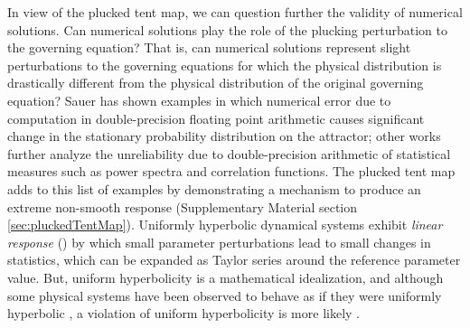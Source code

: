 In view of the plucked tent map, we can question further the
validity of numerical solutions. Can numerical solutions play 
the role of the plucking perturbation to the 
governing equation? That is, can numerical solutions represent 
slight perturbations to the governing equations for which the physical 
distribution is drastically different from the physical distribution 
of the original governing equation? Sauer \cite{sauer} has shown 
examples in which numerical error due to computation in double-precision floating point arithmetic causes significant change in the stationary probability distribution on the attractor; other works \cite{cns} further analyze the unreliability due to double-precision arithmetic of statistical measures such as power spectra and correlation functions. The plucked tent map adds to this list of examples by demonstrating a mechanism to produce an extreme non-smooth response (Supplementary Material section \ref{sec:pluckedTentMap}). Uniformly hyperbolic 
dynamical systems exhibit \emph{linear response} 
(\cite{ruelle}\cite{baladi}) by which small parameter perturbations 
lead to small changes in statistics, which can be expanded as Taylor series around the reference parameter value. But, uniform hyperbolicity is a mathematical idealization, and although some physical systems have been observed to behave as if they were uniformly hyperbolic \cite{gallavotti}, a violation of uniform hyperbolicity is more likely 
\cite{wormell}\cite{luca}. 

